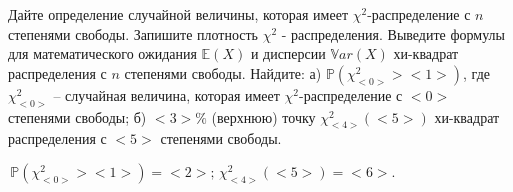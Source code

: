 \documentclass{article}%
\begin{document}
\begin{problem}
Дайте определение случайной величины, которая имеет $\chi^2$-распределение с $n$
степенями свободы. Запишите плотность $\chi^2$ - распределения.
Выведите формулы для математического ожидания $\mathbb E(X)$ и дисперсии $\mathbb Var(X)$ хи-квадрат распределения с
$n$ степенями свободы. Найдите:
а) $\mathbb P(\chi_{<0>}^2><1>)$, где $\chi_{<0>}^2$ -- случайная величина, которая имеет
$\chi^2$-распределение с $<0>$ степенями свободы;
б) $<3>\%$ (верхнюю) точку $\chi_{<4>}^2(<5>)$ хи-квадрат распределения с $<5>$ степенями свободы.
\end{problem}

\begin{solution*}
$ \,\mathbb P(\chi_{<0>}^2><1>)=<2>;\,
\chi_{<4>}^2(<5>)=<6>.\,$
\end{solution*}
\end{document}
